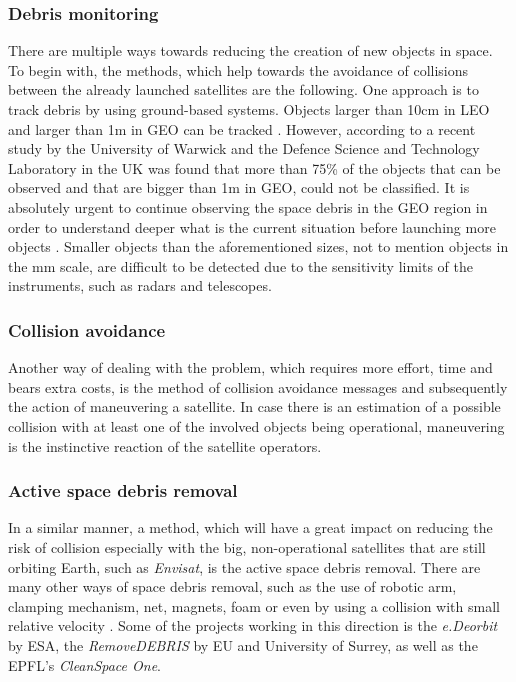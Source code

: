 \subsubsection{Debris monitoring}
There are multiple ways towards reducing the creation of new objects in space. %
To begin with, the methods, which help towards the avoidance of collisions between the already launched satellites are the following. One approach is to track debris by using ground-based systems. Objects larger than 10cm in LEO and larger than 1m in GEO can be tracked \cite{Kramer 2002}. However, according to a recent study by the University of Warwick and the Defence Science and Technology Laboratory in the UK was found that more than 75\% of the objects that can be observed and that are bigger than 1m in GEO, could not be classified. It is absolutely urgent to continue observing the space debris in the GEO region in order to understand deeper what is the current situation before launching more objects \cite{Blake}. %
 Smaller objects than the aforementioned sizes, not to mention objects in the mm scale, are difficult to be detected due to the sensitivity limits of the instruments, such as radars and telescopes.

\bigskip
\subsubsection{Collision avoidance}
Another way of dealing with the problem, which requires more effort, time and bears extra costs, is the method of collision avoidance messages and subsequently the action of maneuvering a satellite. In case there is an estimation of a possible collision with at least one of the involved objects being operational, maneuvering is the instinctive reaction of the satellite operators.

\bigskip
\subsubsection{Active space debris removal}
In a similar manner, a method, which will have a great impact on reducing the risk of collision especially with the big, non-operational satellites that are still orbiting Earth, such as \textit{Envisat}, is the active space debris removal. There are many other ways of space debris removal, such as the use of robotic arm, clamping mechanism, net, magnets, foam or even by using a collision with small relative velocity \cite{active, takeichi}. Some of the projects working in this direction is the \textit{e.Deorbit} by ESA, the \textit{RemoveDEBRIS} by EU and University of Surrey, as well as the EPFL's \textit{CleanSpace One}.

